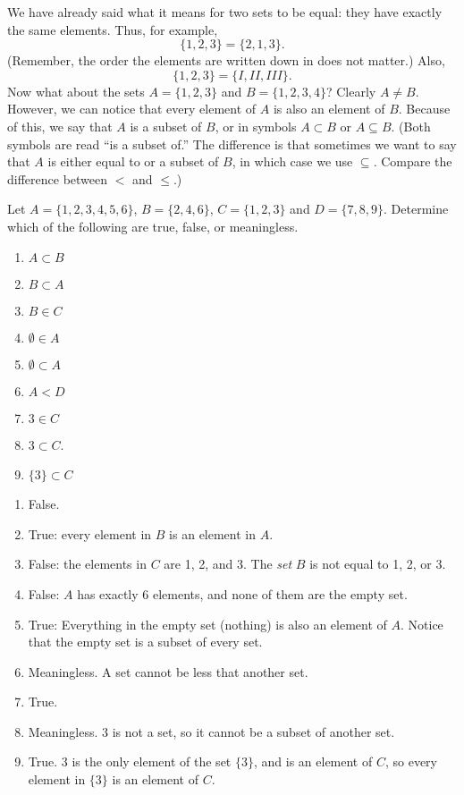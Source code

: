 \documentclass[12pt]{article}
\begin{document}
We have already said what it means for two sets to be equal: they have exactly the same elements.  Thus, for example,
\[ \{1, 2, 3\} = \{2, 1, 3\}.\]
(Remember, the order the elements are written down in does not matter.)  Also,
\[ \{1, 2, 3\} = \{I, II, III\}.\]
Now what about the sets $A = \{1, 2, 3\}$ and $B = \{1, 2, 3, 4\}$?  Clearly $A \ne B$.  However, we can notice that every element of $A$ is also an element of $B$.  Because of this, we say that $A$ is a subset of $B$, or in symbols $A \subset B$ or $A \subseteq B$.  (Both symbols are read ``is a subset of.'' The difference is that sometimes we want to say that $A$ is either equal to or a subset of $B$, in which case we use $\subseteq$.  Compare the difference between $<$ and $\le$.)

\begin{example}
 Let $A = \{1, 2, 3, 4, 5, 6\}$, $B = \{2, 4, 6\}$, $C = \{1, 2, 3\}$ and $D = \{7, 8, 9\}$.  Determine which of the following are true, false, or meaningless.
\begin{multicols}{3}
\begin{enumerate}
\item $A \subset B$
\item $B \subset A$
\item $B \in C$
\item $\emptyset \in A$
\item $\emptyset \subset A$
\item $A < D$
\item $3 \in C$
\item $3 \subset C$.
\item $\{3\} \subset C$
\end{enumerate}
\end{multicols}
\begin{solution}
 \begin{enumerate}
  \item False.
\item True: every element in $B$ is an element in $A$.
\item False: the elements in $C$ are 1, 2, and 3.  The \emph{set} $B$ is not equal to 1, 2, or 3.
\item False: $A$ has exactly 6 elements, and none of them are the empty set.
\item True: Everything in the empty set (nothing) is also an element of $A$.  Notice that the empty set is a subset of every set.
\item Meaningless.  A set cannot be less that another set.
\item True.
\item Meaningless.  $3$ is not a set, so it cannot be a subset of another set.
\item True.  $3$ is the only element of the set $\{3\}$, and is an element of $C$, so every element in $\{3\}$ is an element of $C$.
 \end{enumerate}
\end{solution}
\end{example}
\end{document}
